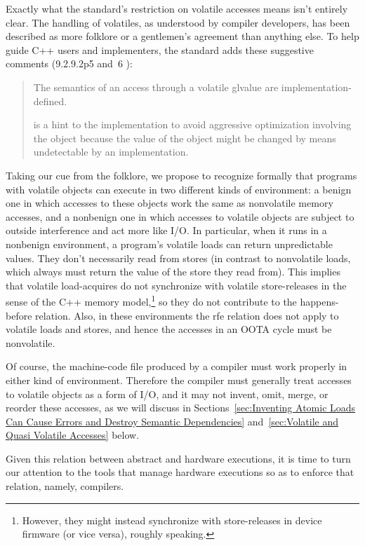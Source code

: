 Exactly what the standard's restriction on volatile accesses means
isn't entirely clear.
The handling of volatiles, as understood by compiler developers, has
been described as more folklore or a gentlemen's agreement than
anything else.
To help guide C++ users and implementers, the standard adds these
suggestive comments (9.2.9.2p5 and~6 ):
\begin{quote}
	The semantics of an access through a volatile glvalue are
	implementation-defined.

	 is a hint to the implementation to avoid aggressive
	optimization involving the object because the value of the object
	might be changed by means undetectable by an implementation.
\end{quote}

Taking our cue from the folklore, we propose to recognize formally
that programs with volatile objects can execute in two different kinds
of environment: a benign one in which accesses to these objects work
the same as nonvolatile memory accesses, and a nonbenign one in which
accesses to volatile objects are subject to outside interference and
act more like I/O.
In particular, when it runs in a nonbenign environment, a program's
volatile loads can return unpredictable values.
They don't necessarily read from stores (in contrast to nonvolatile loads,
which always must return the value of the store they read from).
This implies that volatile load-acquires do not synchronize with
volatile store-releases in the sense of the C++ memory model,\footnote{
	However, they might instead synchronize with store-releases in
	device firmware (or vice versa), roughly speaking.}
so they do not contribute to the happens-before relation.
Also, in these environments the rfe relation does not apply to volatile
loads and stores, and hence the accesses in an OOTA cycle must be nonvolatile.

Of course, the machine-code file produced by a compiler must work
properly in either kind of environment.
Therefore the compiler must generally treat accesses to volatile objects
as a form of I/O, and it may not
invent, omit, merge, or reorder these accesses, as we will discuss in
Sections~\ref{sec:Inventing Atomic Loads Can Cause Errors and Destroy Semantic Dependencies}
and~\ref{sec:Volatile and Quasi Volatile Accesses} below.

Given this relation between abstract and hardware executions, it is time
to turn our attention to the tools that manage hardware executions so as
to enforce that relation, namely, compilers.


